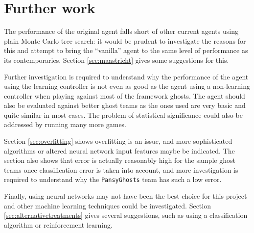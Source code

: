 \section{Further work}

The performance of the original agent falls short of other current agents using plain Monte Carlo tree search: it would be prudent to investigate the reasons for this and attempt to bring the ``vanilla'' agent to the same level of performance as its contemporaries.  Section \ref{sec:maastricht} gives some suggestions for this.

Further investigation is required to understand why the performance of the agent using the learning controller is not even as good as the agent using a non-learning controller when playing against most of the framework ghosts.  The agent should also be evaluated against better ghost teams as the ones used are very basic and quite similar in most cases.  The problem of statistical significance could also be addressed by running many more games.

Section \ref{sec:overfitting} shows overfitting is an issue, and more sophisticated algorithms or altered neural network input features maybe be indicated.  The section also shows that error is actually reasonably high for the sample ghost teams once classification error is taken into account, and more investigation is required to understand why the {\tt PansyGhosts} team has such a low error.

Finally, using neural networks may not have been the best choice for this project and other machine learning techniques could be investigated.  Section \ref{sec:alternativetreatments} gives several suggestions, such as using a classification algorithm or reinforcement learning.
